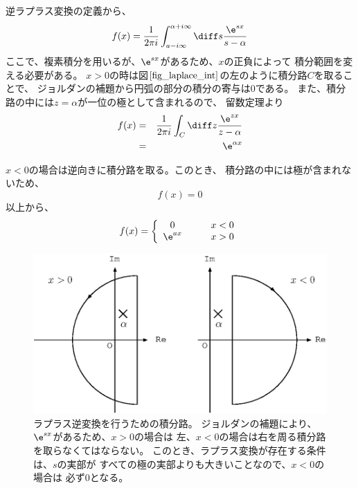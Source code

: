 逆ラプラス変換の定義から、
\begin{equation}
  f(x) = \frac{1}{2 \pi i} \int_{a-i\infty}^{\alpha+i\infty} \diff s \frac{\e^{sx}}{s-\alpha}
\end{equation}
ここで、複素積分を用いるが、$\e^{sx}$があるため、$x$の正負によって
積分範囲を変える必要がある。
$x>0$の時は図$\ref{fig_laplace_int}$の左のように積分路$C$を取ることで、
ジョルダンの補題から円弧の部分の積分の寄与は$0$である。
また、積分路の中には$z=\alpha$が一位の極として含まれるので、
留数定理より
\begin{eqnarray}
  f(x) &=& \frac{1}{2 \pi i} \int_C \diff z \frac{\e^{zx}}{z-\alpha}\\
  &=& \e^{\alpha x}
\end{eqnarray}

$x<0$の場合は逆向きに積分路を取る。このとき、
積分路の中には極が含まれないため、
\begin{equation}
  f(x) = 0
\end{equation}
以上から、
\begin{equation}
  f(x) = \left\{
  \begin{array}{cc}
    0       & \qquad x<0 \\
    \e^{ax} & \qquad x>0
  \end{array}
  \right.
\end{equation}


\begin{figure}[htbp]
  \begin{center}
    \includegraphics[width=.5\linewidth]{fig/laplace_int.eps}
  \end{center}
  \caption{
    ラプラス逆変換を行うための積分路。
    ジョルダンの補題により、$\e^{sx}$があるため、$x>0$の場合は
    左、$x<0$の場合は右を周る積分路を取らなくてはならない。
    このとき、ラプラス変換が存在する条件は、$s$の実部が
    すべての極の実部よりも大きいことなので、$x<0$の場合は
    必ず$0$となる。
  }
  \label{fig_laplace_int}
\end{figure}


